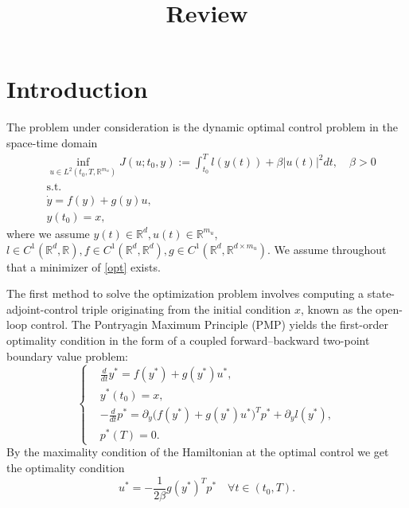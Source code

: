 \documentclass[11pt]{amsart}
\title[Review]{Review}
\theoremstyle{definition}
\theoremstyle{remark}
\begin{document}
\tableofcontents

\section{Introduction}
The problem under consideration is the dynamic optimal control problem in the space-time domain
\begin{equation*}
\tag{$P$}\label{opt}
\begin{aligned}
	&\inf_{u \in L^2(t_0, T, \mathbb{R}^{m_u})} J(u; t_0, y):= \int_{t_0}^T l(y(t)) + \beta |u(t)|^2 dt, \quad \beta >0\\
	&\text{s.t.}\\
	& \dot{y} = f(y) + g(y) u,\\
	& y(t_0) = x,
\end{aligned}
\end{equation*}
where we assume $y(t) \in \mathbb{R}^d, u(t) \in \mathbb{R}^{m_u}$, $l \in C^1(\mathbb{R}^d, \mathbb{R}), f \in C^1(\mathbb{R}^d, \mathbb{R}^d), g \in C^1(\mathbb{R}^d, \mathbb{R}^{d \times m_u})$. 
We assume throughout that a minimizer of \eqref{opt} exists.\par

The first method to solve the optimization problem involves computing a state-adjoint-control triple originating from the initial condition $x$, known as the open-loop control. The Pontryagin Maximum Principle (PMP) yields the first-order optimality condition in the form of a coupled forward--backward two-point boundary value problem:
\begin{equation*}
\tag{TPBVP}\label{TPBVP}
\left\{
\begin{aligned}
	&\frac{d}{dt}y^* = f(y^*) + g(y^*)u^*,\\
	& y^*(t_0) = x, \\
	& -\frac{d}{dt} p^* = \partial_y \bigg( f(y^*) +  g(y^*) u^* \bigg)^Tp^* + \partial_y l(y^*),\\
	& p^*(T) = 0.
\end{aligned}
\right.
\end{equation*}
By the maximality condition of the Hamiltonian at the optimal control we get the optimality condition
\begin{equation}
	u^* = - \frac{1}{2\beta} g(y^*)^T p^* \quad \forall t \in (t_0, T). 
\end{equation}
\end{document}
